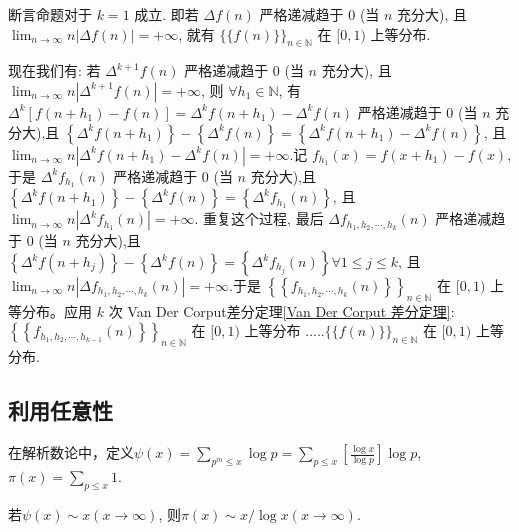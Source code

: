 \begin{note}
    断言命题对于 $k=1$ 成立. 即若 $\Delta f(n)$ 严格递减趋于 0 (当 $n$ 充分大), 且 $\lim _{n \rightarrow \infty} n|\Delta f(n)|=+\infty$, 就有 $\{\{f(n)\}\}_{n \in \mathbb{N}}$ 在 $[0,1)$ 上等分布.

    现在我们有:
    若 $\Delta^{k+1} f(n)$ 严格递减趋于 0 (当 $n$ 充分大), 且 $\lim _{n \rightarrow \infty} n\left|\Delta^{k+1} f(n)\right|=+\infty$, 则 $\forall h_1 \in \mathbb{N}$, 有 $\Delta^k\left[f\left(n+h_1\right)-f(n)\right]=\Delta^k f\left(n+h_1\right)-\Delta^k f(n)$ 严格递减趋于 0 (当 $n$ 充分大),且 $\left\{\Delta^k f\left(n+h_1\right)\right\}-\left\{\Delta^k f(n)\right\}=\left\{\Delta^k f\left(n+h_1\right)-\Delta^k f(n)\right\}$, 且 $\lim _{n \rightarrow \infty} n\left|\Delta^k f\left(n+h_1\right)-\Delta^k f(n)\right|=+\infty$.记 $f_{h_1}(x)=f\left(x+h_1\right)-f(x)$, 于是 $\Delta^k f_{h_1}(n)$ 严格递减趋于 0 (当 $n$ 充分大),且 $\left\{\Delta^k f\left(n+h_1\right)\right\}-\left\{\Delta^k f(n)\right\}=\left\{\Delta^k f_{h_1}(n)\right\}$, 且 $\lim _{n \rightarrow \infty} n\left|\Delta^k f_{h_1}(n)\right|=+\infty$.
    重复这个过程, 最后 $\Delta f_{h_1, h_2, \cdots, h_k}(n)$ 严格递减趋于 0 (当 $n$ 充分大),且 $\left\{\Delta^k f\left(n+h_j\right)\right\}-\left\{\Delta^k f(n)\right\}=\left\{\Delta^k f_{h_j}(n)\right\} \forall 1 \leq j \leq k$, 且 $\lim _{n \rightarrow \infty} n\left|\Delta f_{h_1, h_2, \cdots, h_k}(n)\right|=+\infty$.于是 $\left\{\left\{f_{h_1, h_2, \cdots, h_k}(n)\right\}\right\}_{n \in \mathbb{N}}$ 在 $[0,1)$ 上等分布。应用 $k$ 次 Van Der Corput差分定理\cref{Van Der Corput 差分定理}: $\left\{\left\{f_{h_1, h_2, \cdots, h_{k-1}}(n)\right\}\right\}_{n \in \mathbb{N}}$ 在 $[0,1)$ 上等分布 $\ldots . .\{\{f(n)\}\}_{n \in \mathbb{N}}$ 在 $[0,1)$ 上等分布.
\end{note}

\subsection{利用任意性}

在解析数论中，定义$\displaystyle \psi(x)=\sum_{p^m\le x}\log p=\sum_{p\le x}\left[\frac{\log x}{\log p}\right]\log p$, $\displaystyle \pi (x)=\sum_{p\le x}1$.

\begin{theorem}
    若$\psi(x)\sim x(x\to\infty)$, 则$\pi (x)\sim x/\log x(x\to \infty)$.
\end{theorem}

